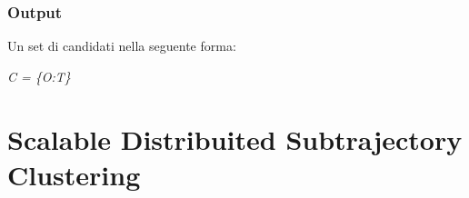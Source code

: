 \documentclass{beamer}
\begin{document}
\begin{frame}
	\frametitle{Output}
	Un set di candidati nella seguente forma: 
	
	\begin{center}
		\huge  \textit{C = \{O:T\}} 
	\end{center}
	
	
\end{frame}




\section{Scalable Distribuited Subtrajectory Clustering}




\begin{frame}
\titlepage %
\end{frame}

\end{document}
